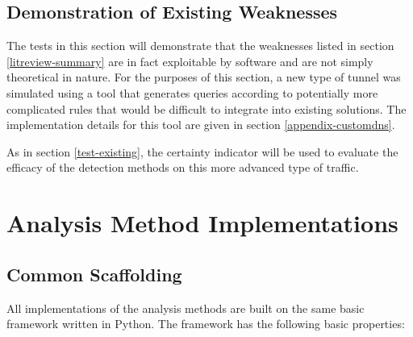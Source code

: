 \documentclass[12pt]{report}
\theoremstyle{remark}
\theoremstyle{definition}
\theoremstyle{definition}
\theoremstyle{definition}
\begin{document}
\subsection{Demonstration of Existing Weaknesses}
\label{test-weakness}
The tests in this section will demonstrate that the weaknesses listed in section
\ref{litreview-summary} are in fact exploitable by software and are not simply
theoretical in nature. For the purposes of this section, a new type of tunnel
was simulated using a tool that generates queries according to potentially more
complicated rules that would be difficult to integrate into existing solutions.
The implementation details for this tool are given in section
\ref{appendix-customdns}.

As in section \ref{test-existing}, the certainty indicator will be used to
evaluate the efficacy of the detection methods on this more advanced type of
traffic.

\section{Analysis Method Implementations}
\label{implementations}
\subsection{Common Scaffolding}
\label{scaffolding}
All implementations of the analysis methods are built on the same basic
framework written in Python. The framework has the following basic properties:
\end{document}
